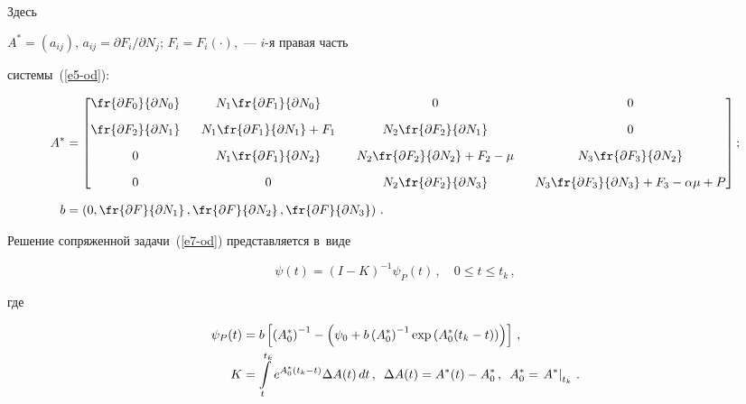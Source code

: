 Здесь


$A^*=(a_{ij})$, $a_{ij}=\partial F_i/\partial N_j$; $F_i=F_i(\cdot)$,~--- $i$-я правая часть 


системы~(\ref{e5-od}):


\begin{align*}


A^*&= \begin{bmatrix}


\fr{\partial F_0}{\partial N_0} &\ \ N_1\fr{\partial F_1}{\partial N_0} &\ \ 0 &\ \ 0\\[9pt]


\fr{\partial F_2}{\partial N_1} &\ \ N_1\fr{\partial F_1}{\partial N_1}+F_1 &\ \ 


N_2\fr{\partial F_2}{\partial N_1} &\ \ 0\\[9pt]


0&\ \ N_1\fr{\partial F_1}{\partial N_2} &\ \ N_2\fr{\partial F_2}{\partial N_2}+F_2-


\mu &\ \ N_3\fr{\partial F_3}{\partial N_2}\\[9pt]


0&\ \ 0&\ \ N_2\fr{\partial F_2}{\partial N_3} &\ \ N_3\fr{\partial F_3}{\partial 


N_3}+F_3-\alpha\mu+P


\end{bmatrix};


\\[6pt]


b&=\left( 0, \fr{\partial F}{\partial N_1}\,,\fr{\partial F}{\partial N_2}\,, \fr{\partial F}{\partial N_3}\right)\,.


\end{align*}





Решение сопряженной задачи~(\ref{e7-od}) представляется в~виде


\begin{equation}


\psi(t)=(I-K)^{-1}\psi_P(t)\,,\quad 0\leq t\leq t_k\,,


\label{e9-od}


\end{equation}


где


\begin{align*}


\psi_P(t)&= b\left[ \left( A_0^*\right)^{-1}-\left( \psi_0+b\left( A_0^*\right)^{-1} \exp 


\left( A_0^*(t_k-t)\right)\right)\right]\,,\\


K&= \int\limits_t^{t_k} e^{A_0^*(t_k-t)} \Delta A(t)\,dt\,,\enskip \Delta A(t) =A^*(t) 


-A_0^*\,,\enskip A_0^*=\left. A^*\right\vert_{t_k}\,.


\end{align*}


